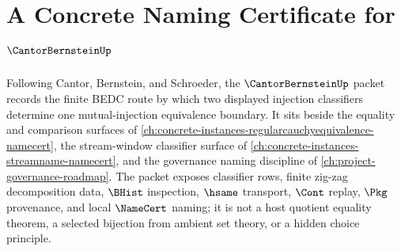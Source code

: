 \chapter{A Concrete Naming Certificate for $\CantorBernsteinUp$}
\label{ch:concrete-instances-cantor-bernstein-namecert}

Following Cantor, Bernstein, and Schroeder, the $\CantorBernsteinUp$ packet records the finite BEDC route by which two displayed injection classifiers determine one mutual-injection equivalence boundary. It sits beside the equality and comparison surfaces of \autoref{ch:concrete-instances-regularcauchyequivalence-namecert}, the stream-window classifier surface of \autoref{ch:concrete-instances-streamname-namecert}, and the governance naming discipline of \autoref{ch:project-governance-roadmap}. The packet exposes classifier rows, finite zig-zag decomposition data, $\BHist$ inspection, $\hsame$ transport, $\Cont$ replay, $\Pkg$ provenance, and local $\NameCert$ naming; it is not a host quotient equality theorem, a selected bijection from ambient set theory, or a hidden choice principle.

